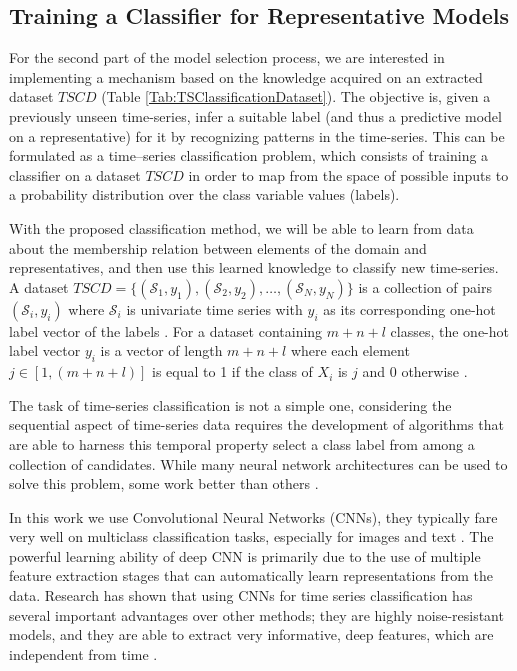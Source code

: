 \subsection{Training a Classifier for Representative Models}
\label{Sec:TrainingClassifier}

For the second part of the model selection process, we are interested in implementing a mechanism based on the knowledge acquired on an extracted dataset $TSCD$ (Table \ref{Tab:TSClassificationDataset}). The objective is, given a previously unseen time-series, infer a suitable label (and thus a predictive model on a representative) for it by recognizing patterns in the time-series. This can be formulated as a time--series classification problem, which consists of training a classifier on a dataset $TSCD$ in order to map from the space of possible inputs to a probability distribution over the class variable values (labels). 

With the proposed classification method, we will be able to learn from data about the membership relation between elements of the domain and representatives, and then use this learned knowledge to classify new time-series. A dataset $TSCD=\{(\mathcal{S}_1,y_1),(\mathcal{S}_2,y_2), \ldots ,(\mathcal{S}_N,y_N)\}$ is a collection of pairs $(\mathcal{S}_i,y_i)$ where $\mathcal{S}_i$ is univariate time series with $y_i$ as its corresponding one-hot label vector of the labels \cite{Gulli2017}. For a dataset containing $m+n+l$ classes, the one-hot label vector $y_i$ is a vector of length $m+n+l$ where each element $j \in [1,(m+n+l)]$ is equal to 1 if the class of $X_i$ is $j$ and $0$ otherwise \cite{Mitsa2010}.

The task of time-series classification is not a simple one, considering the sequential aspect of time-series data requires the development of algorithms that are able to harness this temporal property select a class label from among a collection of candidates. While many neural network architectures can be used to solve this problem, some work better than others \cite{Bagnall2017a}. 

In this work we use Convolutional Neural Networks (CNNs), they typically fare very well on multiclass classification tasks, especially for images and text \cite{Goodfellow2016}. The powerful learning ability of deep CNN is primarily due to the use of multiple feature extraction stages that can automatically learn representations from the data. Research has shown that using CNNs for time series classification has several important advantages over other methods; they are highly noise-resistant models, and they are able to extract very informative, deep features, which are independent from time \cite{Wang2016, Bagnall2017a, Zhao2017}.

